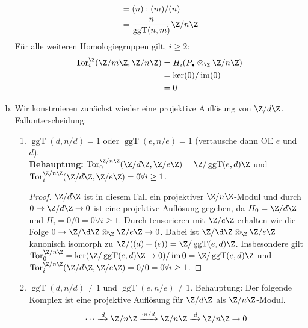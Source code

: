 \documentclass{article}
\newcommand{\im}{\operatorname{im}}
\newcommand{\ggt}{\operatorname{ggT}}
\newcommand{\tor}{\operatorname{Tor}}
\begin{document}
\begin{enumerate}[(a)]
\begin{align*}
                                          & = (n):(m)/(n)                                \\
                                          & = \frac{n}{\ggt(n,m)}\Z/n\Z
          \end{align*}
          Für alle weiteren Homologiegruppen gilt, $i \geq 2:$
          \begin{align*}
              \tor_i^{\Z}(\Z/m\Z, \Z/n\Z) & = H_i(P_\bullet \otimes_\Z \Z/n\Z) \\
                                          & = \ker(0)/\im(0)                   \\
                                          & = 0
          \end{align*}
    \item Wir konstruieren zunächst wieder eine projektive Auflösung von $\Z/d\Z$. Fallunterscheidung:
          \begin{enumerate}[1)]
              \item $\ggt(d, n/d) = 1$ oder $\ggt(e, n/e) = 1$ (vertausche dann OE $e$ und $d$).\\
                    \textbf{Behauptung:} $\tor_0^{\Z/n\Z}(\Z/d\Z, \Z/e\Z) = \Z/\ggt(e,d)\Z$ und
                    $\tor_i^{\Z/n\Z}(\Z/d\Z, \Z/e\Z) = 0 \forall i \geq 1$.
                    \begin{proof}
                        $\Z/d\Z$ ist in diesem Fall ein projektiver $\Z/n\Z$-Modul und durch $0 \to \Z/d\Z \to 0$ ist eine
                        projektive Auflösung gegeben, da $H_0 = \Z/d\Z$ und $H_{i} = 0/0 = 0 \forall i \geq 1$.
                        Durch tensorieren mit $\Z/e\Z$ erhalten wir die Folge $0 \to \Z/\d\Z \otimes_\Z \Z/e\Z \to 0$.
                        Dabei ist $\Z/\d\Z \otimes_\Z \Z/e\Z$ kanonisch isomorph zu $\Z/((d) + (e)) = \Z/\ggt(e,d)\Z$.
                        Insbesondere gilt $\tor_0^{\Z/n\Z} = \ker (\Z/\ggt(e,d)\Z \to 0)/ \im 0 = \Z/\ggt(e,d)\Z$ und
                        $\tor_i^{\Z/n\Z}(\Z/d\Z, \Z/e\Z) = 0/0 = 0 \forall i \geq 1$.
                    \end{proof}
              \item $\ggt(d, n/d) \neq 1$ und $\ggt(e, n/e) \neq 1$.
              Behauptung: Der folgende Komplex ist eine projektive Auflösung für $\Z/d\Z$ als $\Z/n\Z$-Modul.
              \begin{equation}
              	\cdots \xrightarrow{\cdot d} \Z/n\Z \xrightarrow{\cdot n/d} \Z/n\Z \xrightarrow{\cdot d} \Z/n\Z \to 0\label{zdz}
              \end{equation}

\end{enumerate}
\end{enumerate}
\end{document}
